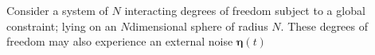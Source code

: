 Consider a system of $N$ interacting degrees of freedom subject to a global constraint; lying on an $N$dimensional sphere of radius $N$. These degrees of freedom may also experience an external noise $\mathbf{\eta}(t)$